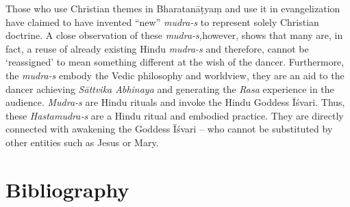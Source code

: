 Those who use Christian themes in Bharatanāṭyaṃ and use it in evangelization have claimed to have invented “new” \textit{mudra-s} to represent solely Christian doctrine. A close observation of these \textit{mudra-s,}however, shows that many are, in fact, a reuse of already existing Hindu \textit{mudra-s }and therefore, cannot be ‘reassigned’ to mean something different at the wish of the dancer. Furthermore, the \textit{mudra-s }embody the Vedic philosophy and worldview, they are an aid to the dancer achieving \textit{Sāttvika Abhinaya} and generating the \textit{Rasa} experience in the audience. \textit{Mudra-s }are Hindu rituals and invoke the Hindu Goddess Īśvari. Thus, these \textit{Hastamudra-s} are a Hindu ritual and embodied practice. They are directly connected with awakening the Goddess Īśvari – who cannot be substituted by other entities such as Jesus or Mary.


\section*{Bibliography}


